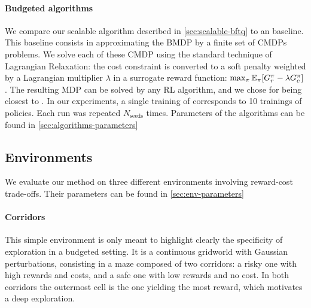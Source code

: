 \paragraph{Budgeted algorithms}\label{par:ex-brl} We compare our  scalable \BFTQ algorithm described in \autoref{sec:scalable-bftq} to an \FTQl baseline. This baseline consists in approximating the BMDP by a finite set of CMDPs problems. We solve each of these CMDP using the standard technique of Lagrangian Relaxation: the cost constraint is converted to a soft penalty weighted by a Lagrangian multiplier $\lambda$ in a surrogate reward function: $\max_{\pi} \operatorname*{\mathbb{E}}_{\pi}[G_r^\pi - \lambda G_c^\pi]$. The resulting MDP can be solved by any RL algorithm, and we chose \FTQ for being closest to \BFTQ.
In our experiments, a single training of \BFTQ corresponds to 10 trainings of \FTQl policies. Each run was repeated $N_{\text{seeds}}$ times. Parameters of the algorithms can be found in \autoref{sec:algorithms-parameters}

\subsection{Environments}
\label{subsec:environments}
We evaluate our method on three different environments involving reward-cost trade-offs. Their parameters can be found in \autoref{sec:env-parameters}

\paragraph{Corridors}
This simple environment is only meant to highlight clearly the specificity of exploration in a budgeted setting. It is a continuous gridworld with Gaussian perturbations, consisting in a maze composed of two corridors: a risky one with high rewards and costs, and a safe one with low rewards and no cost. In both corridors the outermost cell is the one yielding the most reward, which motivates a deep exploration.

